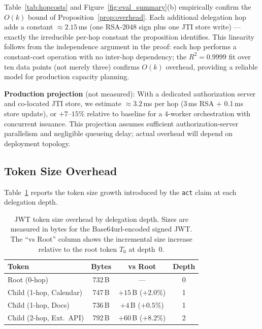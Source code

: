 \documentclass[journal]{IEEEtran}
\theoremstyle{definition}
\begin{document}
Table~\ref{tab:hopcosts} and Figure~\ref{fig:eval_summary}(b) empirically
confirm the $O(k)$ bound of Proposition~\ref{prop:overhead}.
Each additional delegation hop adds a constant $\approx 2.15$\,ms (one RSA-2048 sign plus one JTI store
write) --- exactly the irreducible per-hop constant the proposition
identifies. This linearity follows from the independence argument in the
proof: each hop performs a constant-cost operation with no
inter-hop dependency; the $R^2 = 0.9999$ fit over ten data points (not merely
three) confirms $O(k)$ overhead, providing a reliable model for production
capacity planning.

\textbf{Production projection} (not measured): With a dedicated authorization
server and co-located JTI store, we estimate $\approx 3.2$\,ms per hop
(3\,ms RSA $+$ 0.1\,ms store update), or $+7$--$15\%$ relative to baseline
for a 4-worker orchestration with concurrent issuance. This projection assumes
sufficient authorization-server parallelism and negligible queueing delay;
actual overhead will depend on deployment topology.

\subsection{Token Size Overhead}

Table~\ref{tab:tokensizes} reports the token size growth introduced by the \texttt{act} claim at each delegation depth.

\begin{table}[h]
\caption{JWT token size overhead by delegation depth. Sizes are measured in bytes
for the Base64url-encoded signed JWT. The ``vs Root'' column shows the incremental
size increase relative to the root token $T_0$ at depth~0.}
\label{tab:tokensizes}
\centering
\footnotesize
\begin{tabular}{lccc}
\toprule
\textbf{Token} & \textbf{Bytes} & \textbf{vs Root} & \textbf{Depth} \\
\midrule
Root (0-hop)             & 732\,B & ---                    & 0 \\
Child (1-hop, Calendar)  & 747\,B & $+15$\,B ($+2.0\%$)   & 1 \\
Child (1-hop, Docs)      & 736\,B & $+4$\,B ($+0.5\%$)    & 1 \\
Child (2-hop, Ext.\ API) & 792\,B & $+60$\,B ($+8.2\%$)   & 2 \\
\bottomrule
\end{tabular}
\end{table}
\end{document}
